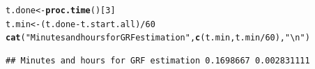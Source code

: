 \documentclass[9pt]{article}\usepackage[]{graphicx}\usepackage[]{xcolor}
\makeatletter
\newcommand{\hlnum}[1]{\textcolor[rgb]{0.686,0.059,0.569}{#1}}%
\newcommand{\hlstr}[1]{\textcolor[rgb]{0.192,0.494,0.8}{#1}}%
\newcommand{\hlopt}[1]{\textcolor[rgb]{0,0,0}{#1}}%
\newcommand{\hlstd}[1]{\textcolor[rgb]{0.345,0.345,0.345}{#1}}%
\newcommand{\hlkwb}[1]{\textcolor[rgb]{0.69,0.353,0.396}{#1}}%
\newcommand{\hlkwd}[1]{\textcolor[rgb]{0.737,0.353,0.396}{\textbf{#1}}}%
\newenvironment{kframe}{%
 \def\at@end@of@kframe{}%
 \ifinner\ifhmode%
  \def\at@end@of@kframe{\end{minipage}}%
  \begin{minipage}{\columnwidth}%
 \fi\fi%
 \def\FrameCommand##1{\hskip\@totalleftmargin \hskip-\fboxsep
 \colorbox{shadecolor}{##1}\hskip-\fboxsep
     \hskip-\linewidth \hskip-\@totalleftmargin \hskip\columnwidth}%
 \MakeFramed {\advance\hsize-\width
   \@totalleftmargin\z@ \linewidth\hsize
   \@setminipage}}%
 {\par\unskip\endMakeFramed%
 \at@end@of@kframe}
\newenvironment{knitrout}{}{} %
\theoremstyle{definition}
\theoremstyle{remark}
\makeatother
\begin{document}
\begin{knitrout}
\color{fgcolor}\begin{kframe}
\begin{alltt}
\hlstd{t.done} \hlkwb{<-} \hlkwd{proc.time}\hlstd{()[}\hlnum{3}\hlstd{]}
\hlstd{t.min} \hlkwb{<-} \hlstd{(t.done} \hlopt{-} \hlstd{t.start.all)}\hlopt{/}\hlnum{60}
\hlkwd{cat}\hlstd{(}\hlstr{"Minutes and hours for GRF estimation"}\hlstd{,} \hlkwd{c}\hlstd{(t.min, t.min}\hlopt{/}\hlnum{60}\hlstd{),} \hlstr{"\textbackslash{}n"}\hlstd{)}
\end{alltt}
\begin{verbatim}
## Minutes and hours for GRF estimation 0.1698667 0.002831111
\end{verbatim}
\end{kframe}
\end{knitrout}


\end{document}

